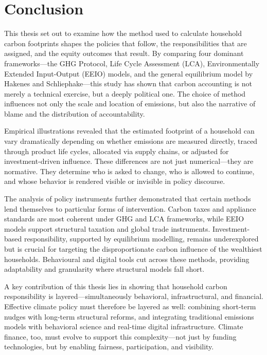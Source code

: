 \documentclass[12pt,a4paper]{article}%
\begin{document}
\section{Conclusion}

This thesis set out to examine how the method used to calculate household carbon footprints shapes the policies that follow, the responsibilities that are assigned, and the equity outcomes that result. By comparing four dominant frameworks—the GHG Protocol, Life Cycle Assessment (LCA), Environmentally Extended Input-Output (EEIO) models, and the general equilibrium model by Hakenes and Schliephake—this study has shown that carbon accounting is not merely a technical exercise, but a deeply political one. The choice of method influences not only the scale and location of emissions, but also the narrative of blame and the distribution of accountability.

Empirical illustrations revealed that the estimated footprint of a household can vary dramatically depending on whether emissions are measured directly, traced through product life cycles, allocated via supply chains, or adjusted for investment-driven influence. These differences are not just numerical—they are normative. They determine who is asked to change, who is allowed to continue, and whose behavior is rendered visible or invisible in policy discourse.

The analysis of policy instruments further demonstrated that certain methods lend themselves to particular forms of intervention. Carbon taxes and appliance standards are most coherent under GHG and LCA frameworks, while EEIO models support structural taxation and global trade instruments. Investment-based responsibility, supported by equilibrium modelling, remains underexplored but is crucial for targeting the disproportionate carbon influence of the wealthiest households. Behavioural and digital tools cut across these methods, providing adaptability and granularity where structural models fall short.

A key contribution of this thesis lies in showing that household carbon responsibility is layered—simultaneously behavioral, infrastructural, and financial. Effective climate policy must therefore be layered as well: combining short-term nudges with long-term structural reforms, and integrating traditional emissions models with behavioral science and real-time digital infrastructure. Climate finance, too, must evolve to support this complexity—not just by funding technologies, but by enabling fairness, participation, and visibility.
\end{document}
